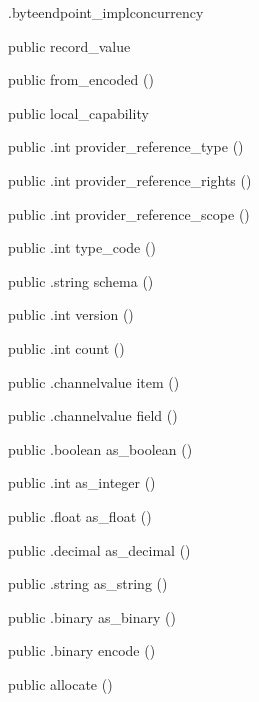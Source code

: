 \begin{CrexxClass}{.byteendpoint\_impl}{concurrency}
\begin{Members}
    \Factory
      {public}
      {record\_value}
      {}

    \Factory
      {public}
      {from\_encoded}
      {()}

    \Factory
      {public}
      {local\_capability}
      {}

    \Method
      {public}
      {.int}
      {provider\_reference\_type}
      {()}

    \Method
      {public}
      {.int}
      {provider\_reference\_rights}
      {()}

    \Method
      {public}
      {.int}
      {provider\_reference\_scope}
      {()}

    \Method
      {public}
      {.int}
      {type\_code}
      {()}

    \Method
      {public}
      {.string}
      {schema}
      {()}

    \Method
      {public}
      {.int}
      {version}
      {()}

    \Method
      {public}
      {.int}
      {count}
      {()}

    \Method
      {public}
      {.channelvalue}
      {item}
      {()}

    \Method
      {public}
      {.channelvalue}
      {field}
      {()}

    \Method
      {public}
      {.boolean}
      {as\_boolean}
      {()}

    \Method
      {public}
      {.int}
      {as\_integer}
      {()}

    \Method
      {public}
      {.float}
      {as\_float}
      {()}

    \Method
      {public}
      {.decimal}
      {as\_decimal}
      {()}

    \Method
      {public}
      {.string}
      {as\_string}
      {()}

    \Method
      {public}
      {.binary}
      {as\_binary}
      {()}

    \Method
      {public}
      {.binary}
      {encode}
      {()}

    \Factory
      {public}
      {allocate}
      {()}


\end{Members}
\end{CrexxClass}
